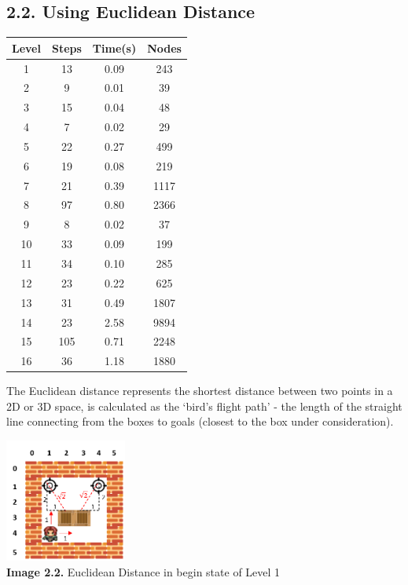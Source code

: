 \documentclass[english, a4paper,12pt]{article}
\begin{document}
\subsection*{2.2. Using Euclidean Distance}
\begin{minipage}{.35\textwidth}
\begin{tabular}{|c|c|c|c|}
\hline
Level & Steps & Time(s) & Nodes \\
\hline
1 & 13 & 0.09 & 243 \\
2 & 9 & 0.01 & 39 \\
3 & 15 & 0.04 & 48 \\
4 & 7 & 0.02 & 29 \\
5 & 22 & 0.27 & 499 \\
6 & 19 & 0.08 & 219 \\
7 & 21 & 0.39 & 1117 \\
8 & 97 & 0.80 & 2366 \\
9 & 8 & 0.02 & 37 \\
10 & 33 & 0.09 & 199 \\
11 & 34 & 0.10 & 285 \\
12 & 23 & 0.22 & 625 \\
13 & 31 & 0.49 & 1807 \\
14 & 23 & 2.58 & 9894 \\
15 & 105 & 0.71 & 2248 \\
16 & 36 & 1.18 & 1880 \\
\hline
\end{tabular}
\end{minipage}
\begin{minipage}{.7\textwidth}
\begin{adjustwidth}{1mm}{}
\hspace*{3mm}The  Euclidean  distance represents  the  shortest distance between two  points  in  a 2D or 3D space, is calculated as the ‘bird’s flight path’ - the length of the straight line connecting from the boxes to goals (closest to the box under consideration).
\end{adjustwidth}

\hspace*{35mm}\includegraphics[width=4cm]{Level1_EUC.png}\\
\hspace*{10mm}\textbf{Image 2.2.} Euclidean Distance in begin state of Level 1
\end{minipage}
\end{document}

